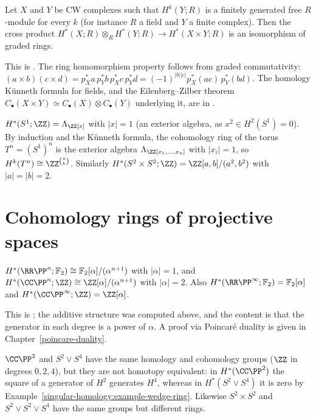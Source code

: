 \begin{theorem}\label{singular-homology:theorem-kunneth}
Let $X$ and $Y$ be CW complexes such that $H^k(Y; R)$ is a finitely generated free $R$-module for every $k$ (for instance $R$ a field and $Y$ a finite complex).
Then the cross product $H^*(X; R) \otimes_R H^*(Y; R) \to H^*(X \times Y; R)$ is an isomorphism of graded rings.
\end{theorem}

This is \cite[Theorem 3.15]{hatcher-at}. The ring homomorphism property follows from graded commutativity:
$(a \times b)(c \times d) = p_X^*a\, p_Y^*b\, p_X^*c\, p_Y^*d = (-1)^{|b||c|}p_X^*(ac)\,p_Y^*(bd)$. The homology K\"unneth formula for fields, and the
Eilenberg--Zilber theorem $C_\bullet(X \times Y) \simeq C_\bullet(X) \otimes C_\bullet(Y)$ underlying it, are in \cite[Section 3.B]{hatcher-at}.

\begin{example}\label{singular-homology:example-torus}
$H^*(S^1; \ZZ) = \Lambda_\ZZ[x]$ with $|x| = 1$ (an exterior algebra, as $x^2 \in H^2(S^1) = 0$). By induction and the K\"unneth formula, the cohomology ring of the torus
$T^n = (S^1)^n$ is the exterior algebra $\Lambda_\ZZ[x_1, \ldots, x_n]$ with $|x_i| = 1$, so $H^k(T^n) \cong \ZZ^{\binom{n}{k}}$. Similarly
$H^*(S^2 \times S^2; \ZZ) = \ZZ[a, b]/(a^2, b^2)$ with $|a| = |b| = 2$.
\end{example}

\section{Cohomology rings of projective spaces}\label{singular-homology:section-projective}

\begin{theorem}\label{singular-homology:theorem-projective-spaces}
$H^*(\RR\PP^n; \mathbb{F}_2) \cong \mathbb{F}_2[\alpha]/(\alpha^{n+1})$ with $|\alpha| = 1$, and $H^*(\CC\PP^n; \ZZ) \cong \ZZ[\alpha]/(\alpha^{n+1})$ with $|\alpha| = 2$. Also
$H^*(\RR\PP^\infty; \mathbb{F}_2) = \mathbb{F}_2[\alpha]$ and $H^*(\CC\PP^\infty; \ZZ) = \ZZ[\alpha]$.
\end{theorem}

This is \cite[Theorem 3.12]{hatcher-at}; the additive structure was computed above, and the content is that the generator in each degree is a power of $\alpha$. A
proof via Poincar\'e duality is given in Chapter~\ref{poincare-duality}.

\begin{example}\label{singular-homology:example-cp2-wedge}
$\CC\PP^2$ and $S^2 \vee S^4$ have the same homology and cohomology groups ($\ZZ$ in degrees $0, 2, 4$), but they are not homotopy equivalent: in $H^*(\CC\PP^2)$ the square of
a generator of $H^2$ generates $H^4$, whereas in $H^*(S^2 \vee S^4)$ it is zero by Example~\ref{singular-homology:example-wedge-ring}. Likewise $S^2 \times S^2$ and
$S^2 \vee S^2 \vee S^4$ have the same groups but different rings.
\end{example}

